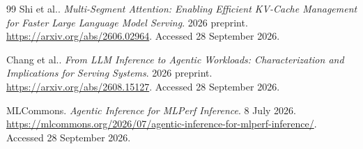 \begin{thebibliography}{99}
 Shi et al.. \emph{Multi-Segment Attention: Enabling Efficient KV-Cache Management for Faster Large Language Model Serving}. 2026 preprint. \url{https://arxiv.org/abs/2606.02964}. Accessed 28 September 2026.

 Chang et al.. \emph{From LLM Inference to Agentic Workloads: Characterization and Implications for Serving Systems}. 2026 preprint. \url{https://arxiv.org/abs/2608.15127}. Accessed 28 September 2026.

 MLCommons. \emph{Agentic Inference for MLPerf Inference}. 8 July 2026. \url{https://mlcommons.org/2026/07/agentic-inference-for-mlperf-inference/}. Accessed 28 September 2026.

\end{thebibliography}
